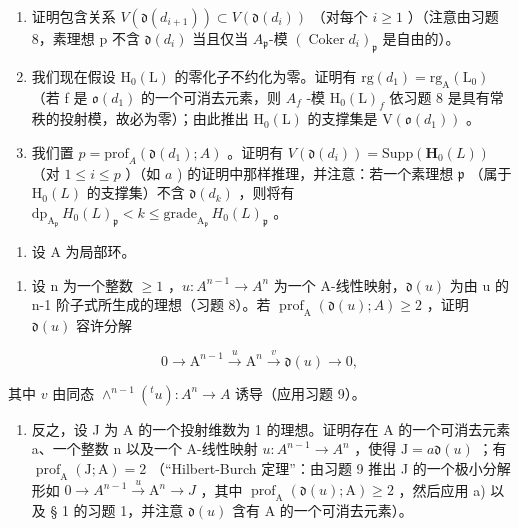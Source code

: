 \begin{enumerate}
\def\labelenumi{\alph{enumi})}
\item
  证明包含关系 \(V(\mathfrak{d}(d_{i+1})) \subset V(\mathfrak{d}(d_i))\) （对每个 \(i \geqslant 1\) ）（注意由习题 8，素理想 p 不含 \(\mathfrak{d}(d_i)\) 当且仅当 \(A_{\mathfrak{p}}\)-模 \((\operatorname{Coker} d_i)_{\mathfrak{p}}\) 是自由的）。
\item
  我们现在假设 \(\mathrm{H}_{0}(\mathrm{L})\) 的零化子不约化为零。证明有 \(\mathrm{rg}(d_{1}) = \mathrm{rg}_{\mathrm{A}}(\mathrm{L}_{0})\) （若 f 是 \(\mathfrak{o}(d_{1})\) 的一个可消去元素，则 \(A_{f}\) -模 \(\mathrm{H}_{0}(\mathrm{L})_{f}\) 依习题 8 是具有常秩的投射模，故必为零）；由此推出 \(\mathrm{H}_{0}(\mathrm{L})\) 的支撑集是 \(\mathrm{V}(\mathfrak{o}(d_{1}))\) 。
\item
  我们置 \(p = \text{prof}_A(\mathfrak{d}(d_1); A)\) 。证明有 \(V(\mathfrak{d}(d_i)) = \text{Supp}(\mathbf{H}_0(L))\) （对 \(1 \leqslant i \leqslant p\) ）（如 \(a\) ) 的证明中那样推理，并注意：若一个素理想 \(\mathfrak{p}\) （属于 \(\mathrm{H}_0(L)\) 的支撑集）不含 \(\mathfrak{d}(d_k)\) ，则将有 \(\text{dp}_{\mathrm{A}_{\mathfrak{p}}} \, H_0(L)_{\mathfrak{p}} < k \leqslant \text{grade}_{\mathrm{A}_{\mathfrak{p}}} \, H_0(L)_{\mathfrak{p}}\) 。
\end{enumerate}

\begin{enumerate}
\def\labelenumi{\arabic{enumi})}
\setcounter{enumi}{10}
\tightlist
\item
  设 A 为局部环。
\end{enumerate}

\begin{enumerate}
\def\labelenumi{\alph{enumi})}
\tightlist
\item
  设 n 为一个整数 \(\geqslant 1\) ，\(u : A^{n-1} \to A^n\) 为一个 A-线性映射，\(\mathfrak{d}(u)\) 为由 u 的 n-1 阶子式所生成的理想（习题 8）。若 \(\operatorname{prof}_{\mathrm{A}}(\mathfrak{d}(u); A) \geqslant 2\) ，证明 \(\mathfrak{d}(u)\) 容许分解
\end{enumerate}

\[
0 \rightarrow \mathrm{A} ^ {n - 1} \xrightarrow {u} \mathrm{A} ^ {n} \xrightarrow {v} \mathfrak {d} (u) \rightarrow 0,
\]

其中 \(v\) 由同态 \(\wedge^{n-1}(^t u): A^n \to A\) 诱导（应用习题 9）。

\begin{enumerate}
\def\labelenumi{\alph{enumi})}
\setcounter{enumi}{1}
\tightlist
\item
  反之，设 J 为 A 的一个投射维数为 1 的理想。证明存在 A 的一个可消去元素 a、一个整数 n 以及一个 A-线性映射 \(u: A^{n-1} \to A^n\) ，使得 \(\mathrm{J} = a\mathfrak{d}(u)\) ；有 \(\operatorname{prof}_{\mathrm{A}}(\mathrm{J}; \mathrm{A}) = 2\) （“Hilbert-Burch 定理”：由习题 9 推出 J 的一个极小分解形如 \(0 \to A^{n-1} \xrightarrow{u} \mathrm{A}^n \to J\) ，其中 \(\operatorname{prof}_{\mathrm{A}}(\mathfrak{d}(u); \mathrm{A}) \geqslant 2\) ，然后应用 a) 以及 § 1 的习题 1，并注意 \(\mathfrak{d}(u)\) 含有 A 的一个可消去元素）。
\end{enumerate}

